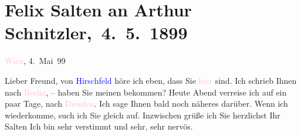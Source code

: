 

\renewcommand{\erwaehntePersonen}{Personen: Georg Hirschfeld}
\renewcommand{\erwaehnteOrte}{Orte: Berlin, Dresden, Wien}
\renewcommand{\erwaehnteWerke}{}
\section[ Felix Salten an Arthur Schnitzler, 4. 5. 1899]{Felix Salten an Arthur Schnitzler, 4. 5. 1899}
\nopagebreak{}
\rehead{ }\normalsize\beginnumbering{}
\toendnotes[C]{\smallbreak\pagebreak[2]}
\toendnotes[C]{\smallbreak}
\pstart
           \raggedleft{}{\pb}\textcolor{pink}{Wien}{}\ledrightnote{\textcolor{pink}{Wien}}, 4. Mai 99\pend
           
\pstart
           Lieber Freund, von \textcolor{blue}{Hirschfeld}{}\ledrightnote{\textcolor{blue}{Georg Hirschfeld}} höre ich eben, dass Sie \textcolor{pink}{hier}{}\ledrightnote{{$\rightarrow$}\textcolor{pink}{Wien}} sind. Ich schrieb Ihnen nach \textcolor{pink}{Berlin}{}\ledrightnote{\textcolor{pink}{Berlin}}, – haben Sie meinen \label{K_L03290-1v}\label{K_L03290-1h} bekommen? Heute{ }Abend verreise ich auf ein paar Tage, nach
                  \textcolor{pink}{Dresden}{}\ledrightnote{\textcolor{pink}{Dresden}}. Ich sage Ihnen bald noch näheres
               darüber. Wenn ich wiederkomme, such ich Sie gleich auf. Inzwischen grüße ich Sie
               herzlichst\pend
           \pstart Ihr \spacefill\mbox{Salten}\pend{}
\pstart
           \noindent{}Ich bin sehr verstimmt und sehr, sehr nervös.\pend
           \endnumbering{}  
      